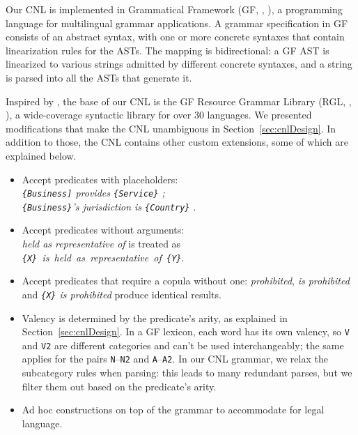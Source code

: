 \documentclass[11pt]{article}
\begin{document}
Our CNL is implemented in Grammatical Framework (GF, \citeauthor{ranta_grammatical_2004}, \citeyear{ranta_grammatical_2004}), a programming language for multilingual grammar applications. 
A grammar specification in GF consists of an abstract syntax, with one or more concrete syntaxes that contain linearization rules for the ASTs. 
The mapping is bidirectional: a GF AST is linearized to various strings admitted by different concrete syntaxes, and a string is parsed into all the ASTs that generate it. 

Inspired by \citet{ranta2014embedded}, the base of our CNL is the GF Resource Grammar Library (RGL, \citeauthor{ranta2009gf}, \citeyear{ranta2009gf}), a wide-coverage syntactic library for over 30 languages.
We presented modifications that make the CNL unambiguous in Section~\ref{sec:cnlDesign}. In addition to those, the CNL contains other custom extensions, some of which are explained below.
\begin{itemize}
    \item Accept predicates with placeholders: \\ {\it {\small \texttt{\{Business]}} provides {\small \texttt{\{Service\}}} ; \\ {\small \texttt{\{Business\}}}'s jurisdiction is {\small \texttt{\{Country\}}} }.
    \item Accept predicates without arguments: \\ {\it held as representative of} is treated as \\ {\it \texttt{\{X\}}~is~held~as~representative~of~\texttt{\{Y\}}}. 

    \item Accept predicates that require a copula without one: {\it prohibited}, {\it is prohibited} and  {\it \texttt{\{X\}} is prohibited} produce identical results.
    
    \item Valency is determined by the predicate's arity, as explained in Section~\ref{sec:cnlDesign}. In a GF lexicon, each word has its own valency, so \texttt{V} and \texttt{V2} are different categories and can't be used interchangeably; the same applies for the pairs \texttt{N}--\texttt{N2} and \texttt{A}--\texttt{A2}. In our CNL grammar, we relax the subcategory rules when parsing: this leads to many redundant parses, but we filter them out based on the predicate's arity.
    
    \item Ad hoc constructions on top of the grammar to accommodate for legal language. 
\end{itemize}
\end{document}
